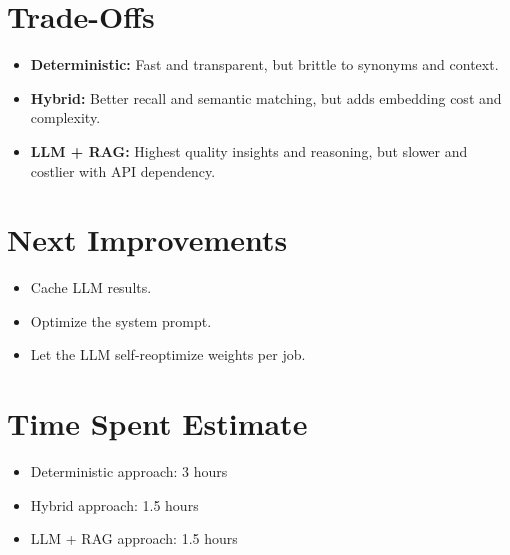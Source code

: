 \documentclass[12pt,a4paper]{article}
\begin{document}
\section{Trade-Offs}
\begin{itemize}
    \item \textbf{Deterministic:} Fast and transparent, but brittle to synonyms and context.
    \item \textbf{Hybrid:} Better recall and semantic matching, but adds embedding cost and complexity.
    \item \textbf{LLM + RAG:} Highest quality insights and reasoning, but slower and costlier with API dependency.
\end{itemize}

\section{Next Improvements}
\begin{itemize}
  \item Cache LLM results.
  \item Optimize the system prompt.
  \item Let the LLM self-reoptimize weights per job.
\end{itemize}

\section{Time Spent Estimate}
\begin{itemize}
    \item Deterministic approach: 3 hours
    \item Hybrid approach: 1.5 hours
    \item LLM + RAG approach: 1.5 hours
\end{itemize}
\end{document}
